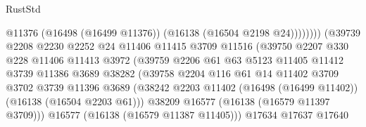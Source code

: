 \begin{lexlean}{RustStd}
\begin{coremodule}
                                              @11376
                                              (@16498 (@16499 @11376))
                                              (@16138 (@16504 @2198 @24))))))))
                                  (@39739
                                    @2208
                                    @2230
                                    @2252
                                    @24
                                    @11406
                                    @11415
                                    @3709
                                    @11516
                                    (@39750
                                      @2207
                                      @330
                                      @228
                                      @11406
                                      @11413
                                      @3972
                                      (@39759
                                        @2206
                                        @61
                                        @63
                                        @5123
                                        @11405
                                        @11412
                                        @3739
                                        @11386
                                        @3689
                                        @38282
                                        (@39758
                                          @2204
                                          @116
                                          @61
                                          @14
                                          @11402
                                          @3709
                                          @3702
                                          @3739
                                          @11396
                                          @3689
                                          (@38242
                                            @2203
                                            @11402
                                            (@16498 (@16499 @11402))
                                            (@16138 (@16504 @2203 @61)))
                                          @38209
                                          @16577
                                          (@16138 (@16579 @11397 @3709)))
                                        @16577
                                        (@16138 (@16579 @11387 @11405)))
                                      @17634
                                      @17637
                                      @17640

\end{coremodule}
\end{lexlean}

